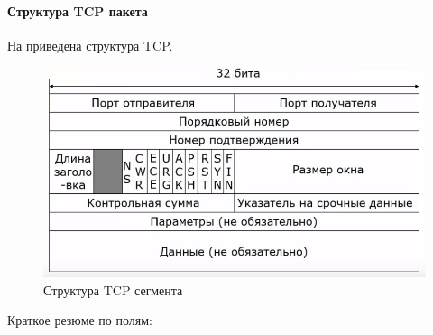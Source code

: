 \paragraph{Структура TCP пакета}\label{par:tcpstruct}
На  приведена структура TCP.
\begin{figure}[h]
	\centering
	\includegraphics[width=0.8\linewidth]{images/pole-tcp}
	\caption{Структура TCP сегмента}
	\label{fig:pole-tcp}
\end{figure}
Краткое резюме по полям:

